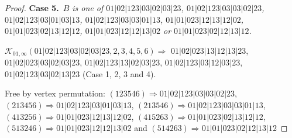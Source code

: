 \documentclass[12pt]{article}
\theoremstyle{plain}
\theoremstyle{definition}
\theoremstyle{remark}
\newcommand{\fancy}[1]{\mathcal{#1}}
\def\K{\fancy{K}}
\newcommand{\case}[2]{{\bf Case #1.}~{\it #2}~~}
\begin{document}
\begin{proof}
	
	
	\bigskip
	
	
	\bigskip
	\case{5}{$B$ is one of $01|02|123|03|02|03|23$, $01|02|123|03|03|02|23$, $01|02|123|03|01|03|13$, $01|02|123|03|03|01|13$, $01|01|023|12|13|12|02$, $01|01|023|02|13|12|12$, $01|01|023|12|12|13|02$ or $01|01|023|02|12|13|12$.}
	
	\bigskip
	
	$\K_{01,\infty}(01|02|123|03|02|03|23,2, 3, 4, 5, 6)\Rightarrow $ $01|02|023|13|12|13|23$, $01|02|023|03|02|03|23$, $01|02|123|13|02|03|23$, $01|02|123|03|12|03|23$, $01|02|123|03|02|13|23$ (Case 1, 2, 3 and 4).
	
	
	
	Free by vertex permutation: $(1 2 3 5 4 6)\Rightarrow 01|02|123|03|03|02|23$, $(2 1 3 4 5 6)\Rightarrow 01|02|123|03|01|03|13$, $(2 1 3 5 4 6)\Rightarrow 01|02|123|03|03|01|13$, $(4 1 3 2 5 6)\Rightarrow 01|01|023|12|13|12|02$, $(4 1 5 2 6 3)\Rightarrow 01|01|023|02|13|12|12$, $(5 1 3 2 4 6)\Rightarrow 01|01|023|12|12|13|02$ and $(5 1 4 2 6 3)\Rightarrow 01|01|023|02|12|13|12$
	
	
	\bigskip
	
\end{proof}
\end{document}
